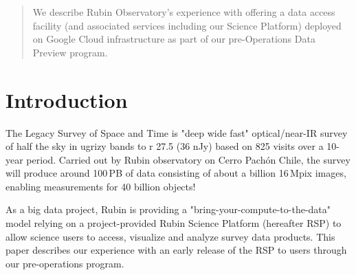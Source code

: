 \documentclass[11pt,twoside]{article}
\begin{document}


\begin{abstract}

We describe Rubin Observatory's experience with offering a data access facility (and associated services including our Science Platform) deployed on Google Cloud infrastructure as part of our pre-Operations Data Preview program.
\end{abstract}

\section{Introduction}

The Legacy Survey of Space and Time \citep{2019ApJ...873..111I} is "deep wide fast" optical/near-IR survey of half the sky in ugrizy bands to r 27.5 (36 nJy) based on 825 visits over a 10-year period.
Carried out by Rubin observatory on Cerro Pach\'{o}n Chile, the survey will produce around 100\,PB of data consisting of about a billion 16\,Mpix images, enabling measurements for 40 billion objects!

As a big data project, Rubin is providing a "bring-your-compute-to-the-data" model relying on a project-provided Rubin Science Platform (hereafter RSP) to allow science users to access, visualize and analyze survey data products.
This paper describes our experience with an early release of the RSP to users through our pre-operations program.
\end{document}
